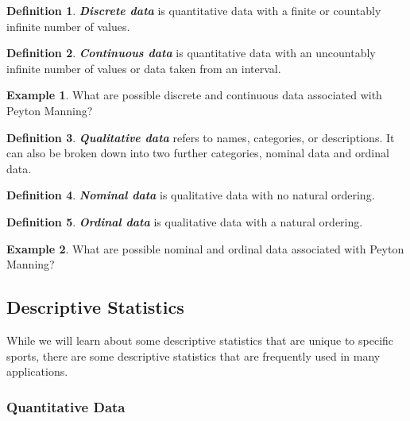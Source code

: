 \documentclass[
  11pt,
]{book}
\theoremstyle{definition}
\newtheorem{definition}{Definition}[chapter]
\theoremstyle{definition}
\newtheorem{example}{Example}[chapter]
\theoremstyle{definition}
\theoremstyle{definition}
\theoremstyle{remark}
\begin{document}
\begin{definition}
\textbf{\emph{Discrete data}} is quantitative data with a finite or countably infinite number of values.
\end{definition}

\begin{definition}
\textbf{\emph{Continuous data}} is quantitative data with an uncountably infinite number of values or data taken from an interval.
\end{definition}

\begin{example}
What are possible discrete and continuous data associated with Peyton Manning?
\end{example}

\vfill

\begin{definition}
\textbf{\emph{Qualitative data}} refers to names, categories, or descriptions. It can also be broken down into
two further categories, nominal data and ordinal data.
\end{definition}

\begin{definition}
\textbf{\emph{Nominal data}} is qualitative data with no natural ordering.
\end{definition}

\begin{definition}
\textbf{\emph{Ordinal data}} is qualitative data with a natural ordering.
\end{definition}

\begin{example}
What are possible nominal and ordinal data associated with Peyton Manning?
\end{example}

\vfill

\newpage

\hypertarget{descriptive-statistics-1}{%
\subsection{Descriptive Statistics}\label{descriptive-statistics-1}}

While we will learn about some descriptive statistics that are unique to specific sports, there are some descriptive statistics that are frequently used in many applications.

\hypertarget{quantitative-data}{%
\subsubsection{Quantitative Data}\label{quantitative-data}}
\end{document}
